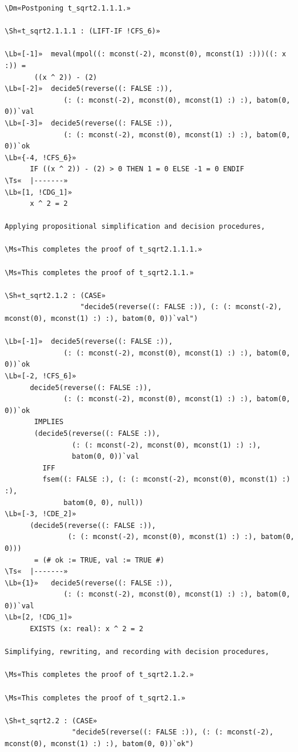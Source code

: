 \documentclass[11pt]{article}
\newcommand\Ms[1]{\textcolor{moss}{\textbf{#1}}}
\newcommand\Dm[1]{\textcolor{muted}{#1}}
\newcommand\Lb[1]{\textcolor{muted}{#1}}
\newcommand\Ts[1]{\textcolor{muted}{#1}}
\newcommand\Sh[1]{\textcolor{accent}{#1}}
\begin{document}
\begin{enumerate}[leftmargin=1.4em, itemsep=10pt, label=\textbf{\textcolor{accent}{\arabic*}}]
\begin{termbox}
\begin{Verbatim}[commandchars=\\«»]
\Dm«Postponing t_sqrt2.1.1.1.»

\Sh«t_sqrt2.1.1.1 : (LIFT-IF !CFS_6)»

\Lb«[-1]»  meval(mpol((: mconst(-2), mconst(0), mconst(1) :)))((: x :)) =
       ((x ^ 2)) - (2)
\Lb«[-2]»  decide5(reverse((: FALSE :)),
              (: (: mconst(-2), mconst(0), mconst(1) :) :), batom(0, 0))`val
\Lb«[-3]»  decide5(reverse((: FALSE :)),
              (: (: mconst(-2), mconst(0), mconst(1) :) :), batom(0, 0))`ok
\Lb«{-4, !CFS_6}»
      IF ((x ^ 2)) - (2) > 0 THEN 1 = 0 ELSE -1 = 0 ENDIF
\Ts«  |-------»
\Lb«[1, !CDG_1]»
      x ^ 2 = 2

Applying propositional simplification and decision procedures,

\Ms«This completes the proof of t_sqrt2.1.1.1.»

\Ms«This completes the proof of t_sqrt2.1.1.»

\Sh«t_sqrt2.1.2 : (CASE»
                  "decide5(reverse((: FALSE :)), (: (: mconst(-2), mconst(0), mconst(1) :) :), batom(0, 0))`val")

\Lb«[-1]»  decide5(reverse((: FALSE :)),
              (: (: mconst(-2), mconst(0), mconst(1) :) :), batom(0, 0))`ok
\Lb«[-2, !CFS_6]»
      decide5(reverse((: FALSE :)),
              (: (: mconst(-2), mconst(0), mconst(1) :) :), batom(0, 0))`ok
       IMPLIES
       (decide5(reverse((: FALSE :)),
                (: (: mconst(-2), mconst(0), mconst(1) :) :),
                batom(0, 0))`val
         IFF
         fsem((: FALSE :), (: (: mconst(-2), mconst(0), mconst(1) :) :),
              batom(0, 0), null))
\Lb«[-3, !CDE_2]»
      (decide5(reverse((: FALSE :)),
               (: (: mconst(-2), mconst(0), mconst(1) :) :), batom(0, 0)))
       = (# ok := TRUE, val := TRUE #)
\Ts«  |-------»
\Lb«{1}»   decide5(reverse((: FALSE :)),
              (: (: mconst(-2), mconst(0), mconst(1) :) :), batom(0, 0))`val
\Lb«[2, !CDG_1]»
      EXISTS (x: real): x ^ 2 = 2

Simplifying, rewriting, and recording with decision procedures,

\Ms«This completes the proof of t_sqrt2.1.2.»

\Ms«This completes the proof of t_sqrt2.1.»

\Sh«t_sqrt2.2 : (CASE»
                "decide5(reverse((: FALSE :)), (: (: mconst(-2), mconst(0), mconst(1) :) :), batom(0, 0))`ok")


\end{Verbatim}
\end{termbox}
\end{enumerate}
\end{document}
